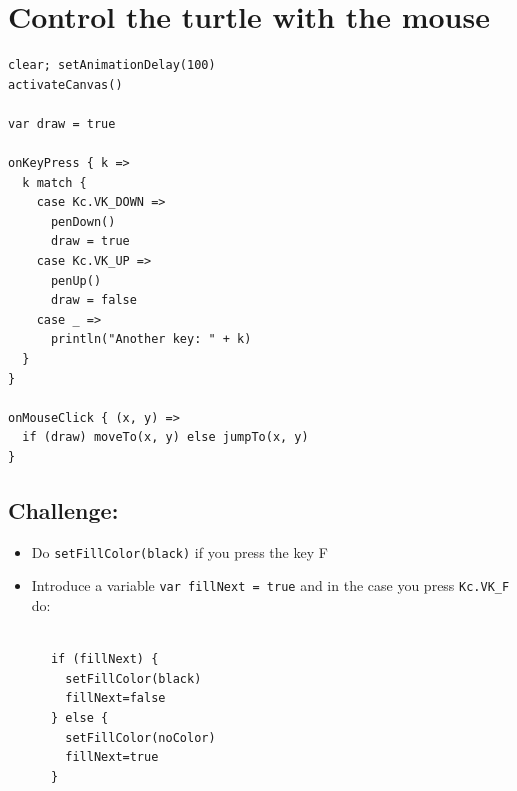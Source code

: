 \chapter{Control the turtle with the mouse}
\begin{multicols}{2}

\begin{lstlisting}[basicstyle={\ttfamily\fontsize{16}{19}\selectfont},numbers=none]
clear; setAnimationDelay(100)
activateCanvas()

var draw = true

onKeyPress { k =>
  k match {
    case Kc.VK_DOWN => 
      penDown()
      draw = true
    case Kc.VK_UP => 
      penUp()
      draw = false
    case _ => 
      println("Another key: " + k)
  }
}

onMouseClick { (x, y) =>
  if (draw) moveTo(x, y) else jumpTo(x, y)
}
\end{lstlisting}
        


\columnbreak


\section*{\color{BrickRed}Challenge:}


\begin{itemize}

\item {Do \lstinline{setFillColor(black)} if you press the key F}
\item {Introduce a variable \lstinline{var fillNext = true} and in the case you press \lstinline{Kc.VK_F} do:}

\end{itemize}



\begin{lstlisting}[numbers=none]

      if (fillNext) {
        setFillColor(black)
        fillNext=false
      } else {
        setFillColor(noColor)
        fillNext=true
      }
      
\end{lstlisting}
        
\end{multicols}

